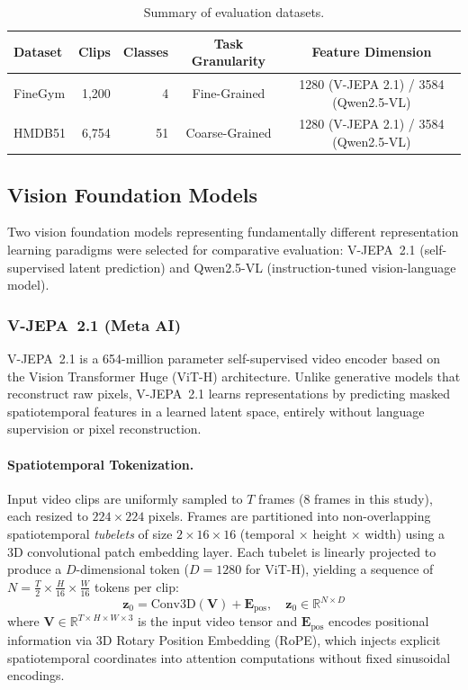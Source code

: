 \begin{table}[H]
\centering
\caption{Summary of evaluation datasets.}
\label{tab:dataset_summary}
\begin{tabular}{lrrcc}
\toprule
\textbf{Dataset} & \textbf{Clips} & \textbf{Classes} & \textbf{Task Granularity} & \textbf{Feature Dimension} \\
\midrule
FineGym & 1,200 & 4 & Fine-Grained & 1280 (V-JEPA 2.1) / 3584 (Qwen2.5-VL) \\
HMDB51  & 6,754 & 51 & Coarse-Grained & 1280 (V-JEPA 2.1) / 3584 (Qwen2.5-VL) \\
\bottomrule
\end{tabular}
\end{table}

\subsection{Vision Foundation Models}

Two vision foundation models representing fundamentally different representation learning paradigms were selected for comparative evaluation: V-JEPA~2.1 (self-supervised latent prediction) and Qwen2.5-VL (instruction-tuned vision-language model).

\subsubsection{V-JEPA~2.1 (Meta AI)}

V-JEPA~2.1 \citep{assran2025vjepa2, murlabadia2026vjepa21} is a 654-million parameter self-supervised video encoder based on the Vision Transformer Huge (ViT-H) architecture. Unlike generative models that reconstruct raw pixels, V-JEPA~2.1 learns representations by predicting masked spatiotemporal features in a learned latent space, entirely without language supervision or pixel reconstruction.

\paragraph{Spatiotemporal Tokenization.}
Input video clips are uniformly sampled to $T$ frames (8 frames in this study), each resized to $224 \times 224$ pixels. Frames are partitioned into non-overlapping spatiotemporal \emph{tubelets} of size $2 \times 16 \times 16$ (temporal $\times$ height $\times$ width) using a 3D convolutional patch embedding layer. Each tubelet is linearly projected to produce a $D$-dimensional token ($D = 1280$ for ViT-H), yielding a sequence of $N = \frac{T}{2} \times \frac{H}{16} \times \frac{W}{16}$ tokens per clip:
\begin{equation}
    \mathbf{z}_0 = \text{Conv3D}(\mathbf{V}) + \mathbf{E}_{\text{pos}}, \quad \mathbf{z}_0 \in \mathbb{R}^{N \times D}
    \label{eq:vjepa_tokenize}
\end{equation}
where $\mathbf{V} \in \mathbb{R}^{T \times H \times W \times 3}$ is the input video tensor and $\mathbf{E}_{\text{pos}}$ encodes positional information via 3D Rotary Position Embedding (RoPE), which injects explicit spatiotemporal coordinates into attention computations without fixed sinusoidal encodings.

